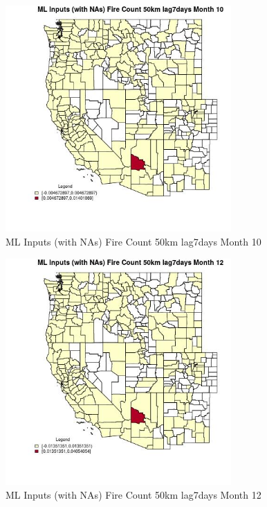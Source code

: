 \begin{figure} 
\centering  
\includegraphics[width=0.77\textwidth]{Code_Outputs/Report_ML_input_PM25_Step4_part_e_de_duplicated_aves_compiled_2019-05-21wNAs_CountyFire_Count_50km_lag7daysmedianMonth10.jpg} 
\caption{\label{fig:Report_ML_input_PM25_Step4_part_e_de_duplicated_aves_compiled_2019-05-21wNAsCountyFire_Count_50km_lag7daysmedianMonth10}ML Inputs (with NAs) Fire Count 50km lag7days Month 10} 
\end{figure} 
 

\begin{figure} 
\centering  
\includegraphics[width=0.77\textwidth]{Code_Outputs/Report_ML_input_PM25_Step4_part_e_de_duplicated_aves_compiled_2019-05-21wNAs_CountyFire_Count_50km_lag7daysmedianMonth12.jpg} 
\caption{\label{fig:Report_ML_input_PM25_Step4_part_e_de_duplicated_aves_compiled_2019-05-21wNAsCountyFire_Count_50km_lag7daysmedianMonth12}ML Inputs (with NAs) Fire Count 50km lag7days Month 12} 
\end{figure} 
 

